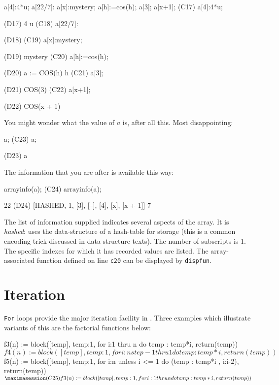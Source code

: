 \beginmaximasession
a[4]:4*u;
a[22/7]:%
a[x]:mystery;
a[h]:=cos(h);
a[3];
a[x+1];
\maximasession
(C17) a[4]:4*u;

(D17)                                 4 u
(C18) a[22/7]:%

(D18)                                 %
(C19) a[x]:mystery;

(D19)                               mystery
(C20) a[h]:=cos(h);

(D20)                            a  := COS(h)
                                  h
(C21) a[3];

(D21)                               COS(3)
(C22) a[x+1];

(D22)                             COS(x + 1)
\endmaximasession


You might wonder what the value of $a$ is, after all this.  Most
disappointing:

\beginmaximasession
a;
\maximasession
(C23) a;

(D23)                                  a
\endmaximasession

The information that you are after is available this way:

\beginmaximasession
arrayinfo(a);
\maximasession
(C24) arrayinfo(a);

                                     22
(D24)              [HASHED, 1, [3], [--], [4], [x], [x + 1]]
                                     7
\endmaximasession

The list of information supplied indicates several aspects
of the array.  It is
{\it hashed}: uses the data-structure of a hash-table for storage
(this is a common encoding trick discussed in data structure texts).
The number of subscripts is 1. The specific indexes for which it has
recorded values are listed.  The array-associated function defined
on line
{\tt c20}
can be displayed
by {\tt dispfun}.

\section{Iteration}

{\tt For} loops provide the major iteration facility in \Max.
Three examples which illustrate variants of this are the factorial
functions below:

\beginmaximasession
f3(n) := block([temp],
                temp:1,
                for i:1 thru n do temp : temp*i,
                return(temp))$
f4(n) := block([temp],
                temp:1,
                for i:n step -1 thru 1 do temp : temp*i,
                return(temp))$
f5(n) := block([temp],
                temp:1,
                for i:n unless i <= 1 do (temp : temp*i , i:i-2),
                return(temp))$
\maximasession
(C25) f3(n) := block([temp],
                temp:1,
                for i:1 thru n do temp : temp*i,
                return(temp))$

